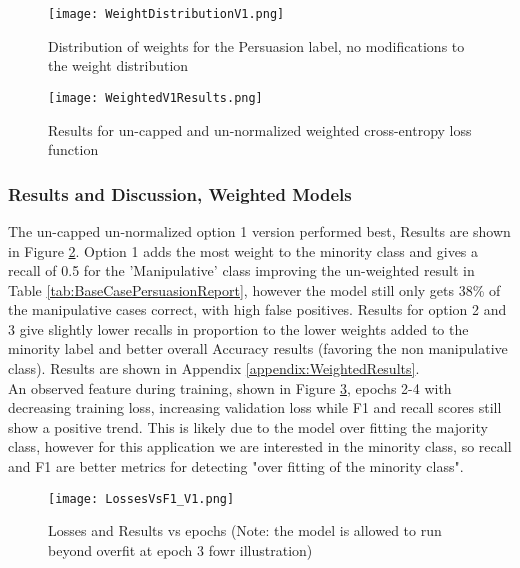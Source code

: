 \documentclass[
	letterpaper, %
	12pt, %
	unnumberedsections, %
	twoside, %
]{LTJournalArticle}
\begin{document}
\begin{figure}[h]
	\centering
	\texttt{[image: WeightDistributionV1.png]}
	\caption{Distribution of weights for the Persuasion label, no modifications to the weight distribution}
	\label{fig:V1WeightDistributionRaw}
\end{figure}%

\begin{figure}[h]
	\centering
	\texttt{[image: WeightedV1Results.png]}

	\caption{Results for un-capped and un-normalized weighted cross-entropy loss function}
	\label{fig:V1WeightResultsRaw}
\end{figure}%

\subsubsection{Results and Discussion, Weighted Models}
The un-capped un-normalized option 1 version performed best, Results are shown in Figure \ref{fig:V1WeightResultsRaw}. Option 1 adds the most weight to the minority class and gives a recall of 0.5 for the 'Manipulative' class improving the un-weighted result in Table \ref{tab:BaseCasePersuasionReport}, however the model still only gets 38\% of the manipulative cases correct, with high false positives. Results for option 2 and 3 give slightly lower recalls in proportion to the lower weights added to the minority label and better overall Accuracy results (favoring the non manipulative class). Results are shown in Appendix \ref{appendix:WeightedResults}. \\
An observed feature during training, shown in Figure \ref{fig:V1EpochPlot}, epochs 2-4 with decreasing training loss, increasing validation loss while F1 and recall scores still show a positive trend. This is likely due to the model over fitting the majority class, however for this application we are interested in the minority class, so recall and F1 are better metrics for detecting "over fitting of the minority class".

\begin{figure}[h]
	\centering
	\texttt{[image: LossesVsF1\_V1.png]}
	\caption{Losses and Results vs epochs (Note: the model is allowed to run beyond overfit at epoch 3 fowr illustration)}
	\label{fig:V1EpochPlot}
\end{figure}%
\end{document}
